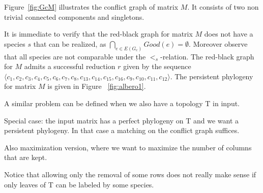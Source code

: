 Figure~\ref{fig:GcM} illustrates the conflict graph of matrix $M$. It consists
of two non trivial connected components and singletons.

It is immediate to verify that the red-black graph for matrix $M$ does not have
a species $s$ that can be realized, as  $\bigcap_{e \in E(G_c)}Good(e) =
\emptyset$.
Moreover observe that all species are not comparable under the $<_s$-relation.
The red-black graph  for $M$   admits a successful reduction   $r $ given by
the sequence $\langle c_1, c_2, c_3, c_4, c_5, c_6, c_7, c_8, c_{13}, c_{14},
c_{15}, c_{16}, c_9, c_{10}, c_{11}, c_{12} \rangle$.
The persistent phylogeny for matrix $M$ is given in Figure ~\ref{fig:albero1}.



A similar problem can be defined when we also have a topology T in input.

Special case: the input matrix has a perfect phylogeny on T and we want a persistent phylogeny. In that case a matching on the conflict graph suffices.

Also maximization version, where we want to maximize the number of columns that are kept.

Notice that allowing only the removal of some rows does not really make sense if only leaves of T can be labeled by some species.

